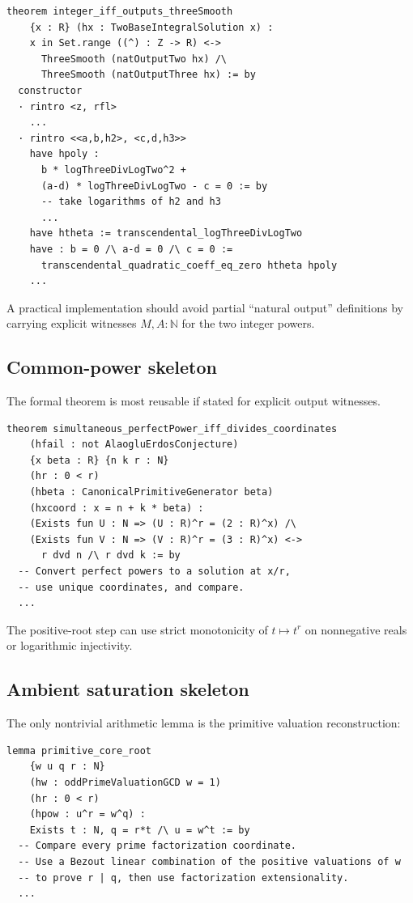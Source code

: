 \documentclass[11pt,oneside]{article}
\theoremstyle{definition}
\newcommand{\N}{\mathbb N}
\begin{document}
\begin{lstlisting}[language={}]
theorem integer_iff_outputs_threeSmooth
    {x : R} (hx : TwoBaseIntegralSolution x) :
    x in Set.range ((^) : Z -> R) <->
      ThreeSmooth (natOutputTwo hx) /\
      ThreeSmooth (natOutputThree hx) := by
  constructor
  · rintro <z, rfl>
    ...
  · rintro <<a,b,h2>, <c,d,h3>>
    have hpoly :
      b * logThreeDivLogTwo^2 +
      (a-d) * logThreeDivLogTwo - c = 0 := by
      -- take logarithms of h2 and h3
      ...
    have htheta := transcendental_logThreeDivLogTwo
    have : b = 0 /\ a-d = 0 /\ c = 0 :=
      transcendental_quadratic_coeff_eq_zero htheta hpoly
    ...
\end{lstlisting}

A practical implementation should avoid partial ``natural output'' definitions by carrying
explicit witnesses \(M,A:\N\) for the two integer powers.

\subsection{Common-power skeleton}

The formal theorem is most reusable if stated for explicit output witnesses.

\begin{lstlisting}[language={}]
theorem simultaneous_perfectPower_iff_divides_coordinates
    (hfail : not AlaogluErdosConjecture)
    {x beta : R} {n k r : N}
    (hr : 0 < r)
    (hbeta : CanonicalPrimitiveGenerator beta)
    (hxcoord : x = n + k * beta) :
    (Exists fun U : N => (U : R)^r = (2 : R)^x) /\
    (Exists fun V : N => (V : R)^r = (3 : R)^x) <->
      r dvd n /\ r dvd k := by
  -- Convert perfect powers to a solution at x/r,
  -- use unique coordinates, and compare.
  ...
\end{lstlisting}

The positive-root step can use strict monotonicity of \(t\mapsto t^r\) on nonnegative
reals or logarithmic injectivity.

\subsection{Ambient saturation skeleton}

The only nontrivial arithmetic lemma is the primitive valuation reconstruction:

\begin{lstlisting}[language={}]
lemma primitive_core_root
    {w u q r : N}
    (hw : oddPrimeValuationGCD w = 1)
    (hr : 0 < r)
    (hpow : u^r = w^q) :
    Exists t : N, q = r*t /\ u = w^t := by
  -- Compare every prime factorization coordinate.
  -- Use a Bezout linear combination of the positive valuations of w
  -- to prove r | q, then use factorization extensionality.
  ...
\end{lstlisting}
\end{document}
